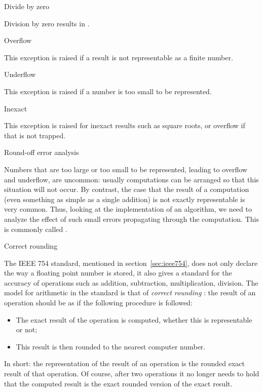 
 {Divide by zero}

Division by zero results in .

 {Overflow}

This exception is raised if a result is not representable
as a finite number.

 {Underflow}

This exception is raised if a number is too small to be represented.

 {Inexact}

This exception is raised for inexact results such as square roots,
or overflow if that is not trapped.

 {Round-off error analysis}
\label{sec:roundoff}

Numbers that are too large or too small to be represented, leading to
overflow and underflow, are
uncommon: usually computations can be arranged so that this situation
will not occur. By contrast, the case that the result of a computation
(even something as simple as a single addition) 
is not exactly representable is very common.
Thus, looking at the
implementation of an algorithm, we need to analyze the
effect of such small errors propagating through the computation.
This is commonly called
.

 {Correct rounding}
\label{sec:correct-round}

The IEEE 754 standard, mentioned in section~\ref{sec:ieee754}, does
not only declare the way a floating point number is stored, it also
gives a standard for the accuracy of operations such as addition,
subtraction, multiplication, division. The model for arithmetic in the
standard is that of \emph{correct rounding}%
%
%
:
the result of an
operation should be as if the following procedure is followed:
\begin{itemize}
\item The exact result of the operation is computed, whether this is
  representable or not;
\item This result is then rounded to the nearest computer number.
\end{itemize}
In short: the representation of the result of an
operation is the rounded exact result of that operation.
Of course,
after two operations it no longer needs to hold that the computed
result is the exact rounded version of the exact result.

